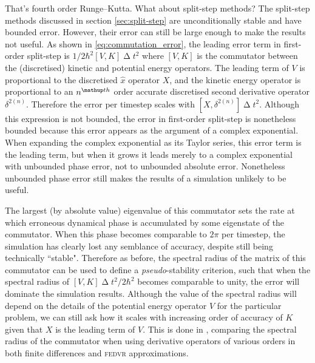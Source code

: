 That's fourth order Runge--Kutta. What about split-step methods? The split-step methods discussed in section \ref{sec:split-step} are unconditionally stable and have bounded error. However, their error can still be large enough to make the results not useful. As shown in \eqref{eq:commutation_error}, the leading error term in first-order split-step is $1/2\hbar^2[V, K]\upDelta t^2$ where $[V, K]$ is the commutator between the (discretised) kinetic and potential energy operators. The leading term of $V$ is proportional to the discretised $\hat x$ operator $X$, and the kinetic energy operator is proportional to an $n^\up{th}$ order accurate discretised second derivative operator $\delta^{2 (n)}$. Therefore the error per timestep scales with $[X, \delta^{2 (n)}]\upDelta t^2$. Although this expression is not bounded, the error in first-order split-step is nonetheless bounded because this error appears as the argument of a complex exponential. When expanding the complex exponential as its Taylor series, this error term is the leading term, but when it grows it leads merely to a complex exponential with unbounded phase error, not to unbounded absolute error. Nonetheless unbounded phase error still makes the results of a simulation unlikely to be useful.

The largest (by absolute value) eigenvalue of this commutator sets the rate at which erroneous dynamical phase is accumulated by some eigenstate of the commutator. When this phase becomes comparable to $2\pi$ per timestep, the simulation has clearly lost any semblance of accuracy, despite still being technically ``stable". Therefore as before, the spectral radius of the matrix of this commutator can be used to define a \emph{pseudo}-stability criterion, such that when the spectral radius of $[V, K]\upDelta t^2/2\hbar^2$ becomes comparable to unity, the error will dominate the simulation results. Although the value of the spectral radius will depend on the details of the potential energy operator $V$ for the particular problem, we can still ask how it scales with increasing order of accuracy of $K$ given that $X$ is the leading term of $V$. This is done in , comparing the spectral radius of the commutator when using derivative operators of various orders in both finite differences and \textsc{fedvr} approximations.

